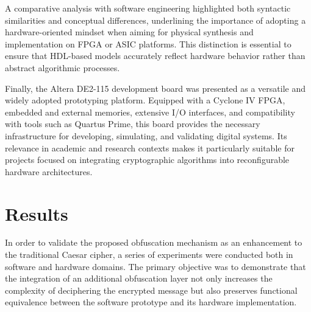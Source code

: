 \documentclass[journal,article,submit,pdftex,moreauthors]{Definitions/mdpi}
\begin{document}
A comparative analysis with software engineering highlighted both syntactic similarities and conceptual differences, underlining the importance of adopting a hardware-oriented mindset when aiming for physical synthesis and implementation on FPGA or ASIC platforms. This distinction is essential to ensure that HDL-based models accurately reflect hardware behavior rather than abstract algorithmic processes.

Finally, the Altera DE2-115 development board was presented as a versatile and widely adopted prototyping platform. Equipped with a Cyclone IV FPGA, embedded and external memories, extensive I/O interfaces, and compatibility with tools such as Quartus Prime, this board provides the necessary infrastructure for developing, simulating, and validating digital systems. Its relevance in academic and research contexts makes it particularly suitable for projects focused on integrating cryptographic algorithms into reconfigurable hardware architectures.





\section{Results}

In order to validate the proposed obfuscation mechanism as an enhancement to the traditional Caesar cipher, a series of experiments were conducted both in software and hardware domains. The primary objective was to demonstrate that the integration of an additional obfuscation layer not only increases the complexity of deciphering the encrypted message but also preserves functional equivalence between the software prototype and its hardware implementation.
\end{document}
